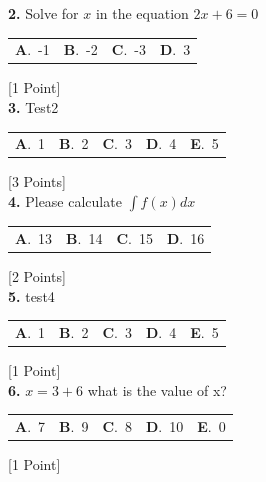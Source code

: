 \documentclass[12pt]{article}
\newcommand{\choice}[2]{\textbf{#1}.~#2}
\begin{document}
\noindent \textbf{\textenglish{2.}} {\textenglish{Solve for }}\(x \){\textenglish{ in the equation }}\(2x+6 = 0 \)

\begin{tabularx}{\linewidth}{@{}*{4}{Y}@{}}
\choice{A}{{{\textenglish{-1}}}} & \choice{B}{{{\textenglish{-2}}}} & \choice{C}{{{\textenglish{-3}}}} & \choice{D}{{{\textenglish{3}}}} \\
\end{tabularx}
\hfill {\textenglish{[1 Point]}}\\[0.5em]

\noindent \textbf{\textenglish{3.}} {\textenglish{Test2}}

\begin{tabularx}{\linewidth}{@{}*{5}{Y}@{}}
\choice{A}{{{\textenglish{1}}}} & \choice{B}{{{\textenglish{2}}}} & \choice{C}{{{\textenglish{3}}}} & \choice{D}{{{\textenglish{4}}}} & \choice{E}{{{\textenglish{5}}}} \\
\end{tabularx}
\hfill {\textenglish{[3 Points]}}\\[0.5em]

\noindent \textbf{\textenglish{4.}} {\textenglish{Please calculate }}\(\int f(x)dx\)

\begin{tabularx}{\linewidth}{@{}*{4}{Y}@{}}
\choice{A}{{{\textenglish{13}}}} & \choice{B}{{{\textenglish{14}}}} & \choice{C}{{{\textenglish{15}}}} & \choice{D}{{{\textenglish{16}}}} \\
\end{tabularx}
\hfill {\textenglish{[2 Points]}}\\[0.5em]

\noindent \textbf{\textenglish{5.}} {\textenglish{test4}}

\begin{tabularx}{\linewidth}{@{}*{5}{Y}@{}}
\choice{A}{{{\textenglish{1}}}} & \choice{B}{{{\textenglish{2}}}} & \choice{C}{{{\textenglish{3}}}} & \choice{D}{{{\textenglish{4}}}} & \choice{E}{{{\textenglish{5}}}} \\
\end{tabularx}
\hfill {\textenglish{[1 Point]}}\\[0.5em]

\noindent \textbf{\textenglish{6.}} \(x=3+6 \){\textenglish{ what is the value of x?}}

\begin{tabularx}{\linewidth}{@{}*{5}{Y}@{}}
\choice{A}{{{\textenglish{7}}}} & \choice{B}{{{\textenglish{9}}}} & \choice{C}{{{\textenglish{8}}}} & \choice{D}{{{\textenglish{10}}}} & \choice{E}{{{\textenglish{0}}}} \\
\end{tabularx}
\hfill {\textenglish{[1 Point]}}\\[0.5em]
\end{document}
